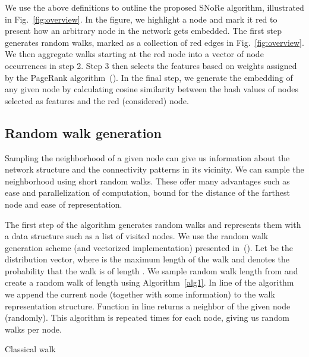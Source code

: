 \documentclass[twoside,11pt]{article}
\begin{document}
We use the above definitions to outline the proposed SNoRe algorithm, illustrated in Fig.~\ref{fig:overview}. In the figure, we highlight a node and mark it red to present how an arbitrary node in the network gets embedded. The first step generates random walks, marked as a collection of red edges in Fig.~\ref{fig:overview}. We then aggregate walks starting at the red node into a vector of node occurrences in step 2. Step 3 then selects the features based on weights assigned by the PageRank algorithm~(\cite{ilprints422}). In the final step, we generate the embedding of any given node by calculating cosine similarity between the hash values of nodes selected as features and the red (considered) node.

\subsection{Random walk generation}
\label{sec:randomgen}
Sampling the neighborhood of a given node can give us information about the network structure and the connectivity patterns in its vicinity. We can sample the neighborhood using short random walks. These offer many advantages such as ease and parallelization of computation, bound for the distance of the farthest node and ease of representation.

The first step of the algorithm generates random walks and represents them with a data structure such as a list of visited nodes. We use the random walk generation scheme (and vectorized implementation) presented in~(\cite{skrlj2019sge}). Let  be the distribution vector, where  is the maximum length of the walk and  denotes the probability that the walk is of length . We sample random walk length  from  and create a random walk of length  using Algorithm~\ref{alg1}. In line  of the algorithm we append the current node  (together with some information) to the walk representation structure. Function  in line  returns a neighbor of the given node (randomly). This algorithm is repeated  times for each node, giving us  random walks per node.

\begin{algorithm}[h]
\caption{Classical walk}
\label{alg1}
\begin{algorithmic}[1]
    \STATE 
    \STATE 
    \FOR{ \TO  } 
        \STATE 
        \STATE 
    \ENDFOR
    \RETURN \;
\end{algorithmic}
\end{algorithm}
\end{document}
